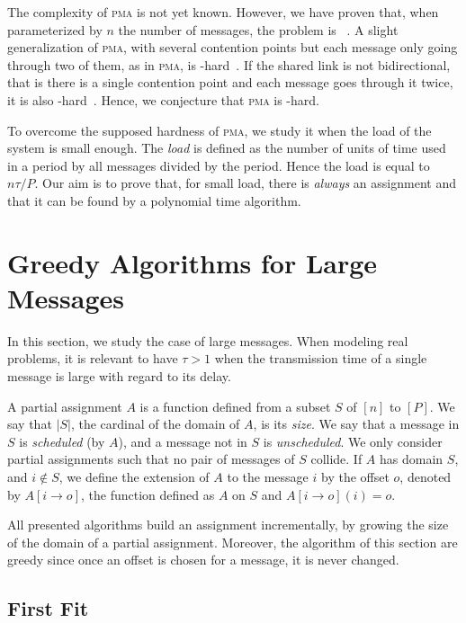 \documentclass[a4paper,UKenglish,cleveref, autoref, thm-restate]{lipics-v2019}
\newcommand\pma{\textsc{pma}\xspace}
\begin{document}
The complexity of \pma is not yet known. However, we have proven that, when parameterized by
$n$ the number of messages, the problem is \FPT~\cite{barth2018deterministic}.
A slight generalization of \pma, with several contention points but each message only going through two of them, as in \pma, is \NP-hard~\cite{barth2018deterministic}. If the shared link is not bidirectional, that is there is a single contention point and each message goes through it twice, it is also \NP-hard~\cite{orman1997complexity}. Hence, we conjecture that \pma is \NP-hard.

To overcome the supposed hardness of \pma, we study it when the load of the system is small enough. The \emph{load} is defined as the number of units of time used in a period by all messages divided by the period. Hence the load is equal to $n\tau /P$. Our aim is to prove that, for small load, there is \emph{always} an assignment and that it can be found by a polynomial time algorithm.



\section{Greedy Algorithms for Large Messages} \label{sec:large}

In this section, we study the case of large messages. When modeling real problems,
it is relevant to have $\tau > 1$ when the transmission time of a single message is large with regard to its delay.

A partial assignment $A$ is a function defined from a subset $S$ of $[n]$ to $[P]$.
We say that $|S|$, the cardinal of the domain of $A$, is its \emph{size}.
We say that a message in $S$ is \emph{scheduled} (by $A$), and a message not in $S$ is \emph{unscheduled}. We only consider partial assignments such that no pair of messages of $S$ collide. If $A$ has domain $S$, and $i \notin S$, we define the extension of $A$ to the message $i$ by the offset $o$, denoted by $A[i \rightarrow o]$, the function defined as $A$ on $S$ and $A[i \rightarrow o](i) = o$.

All presented algorithms build an assignment incrementally, by growing the size of the domain of a partial assignment. Moreover, the algorithm of this section are greedy since once an offset is chosen for a message, it is never changed.


\subsection{First Fit}
\end{document}
